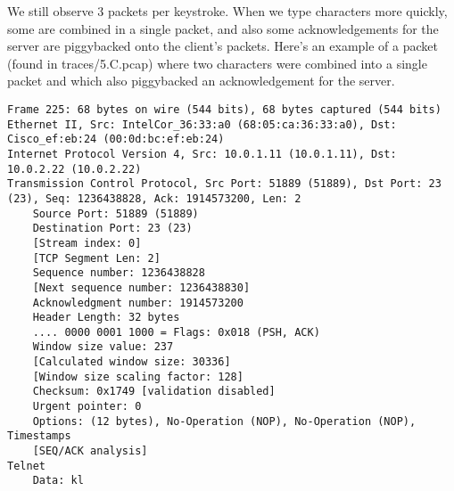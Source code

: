 We still observe 3 packets per keystroke. When we type characters more quickly, some are combined in a single packet, and also some acknowledgements for the server are piggybacked onto the client's packets. Here's an example of a packet (found in traces/5.C.pcap) where two characters were combined into a single packet and which also piggybacked an acknowledgement for the server.

\begin{lstlisting}
Frame 225: 68 bytes on wire (544 bits), 68 bytes captured (544 bits)
Ethernet II, Src: IntelCor_36:33:a0 (68:05:ca:36:33:a0), Dst: Cisco_ef:eb:24 (00:0d:bc:ef:eb:24)
Internet Protocol Version 4, Src: 10.0.1.11 (10.0.1.11), Dst: 10.0.2.22 (10.0.2.22)
Transmission Control Protocol, Src Port: 51889 (51889), Dst Port: 23 (23), Seq: 1236438828, Ack: 1914573200, Len: 2
    Source Port: 51889 (51889)
    Destination Port: 23 (23)
    [Stream index: 0]
    [TCP Segment Len: 2]
    Sequence number: 1236438828
    [Next sequence number: 1236438830]
    Acknowledgment number: 1914573200
    Header Length: 32 bytes
    .... 0000 0001 1000 = Flags: 0x018 (PSH, ACK)
    Window size value: 237
    [Calculated window size: 30336]
    [Window size scaling factor: 128]
    Checksum: 0x1749 [validation disabled]
    Urgent pointer: 0
    Options: (12 bytes), No-Operation (NOP), No-Operation (NOP), Timestamps
    [SEQ/ACK analysis]
Telnet
    Data: kl
\end{lstlisting}